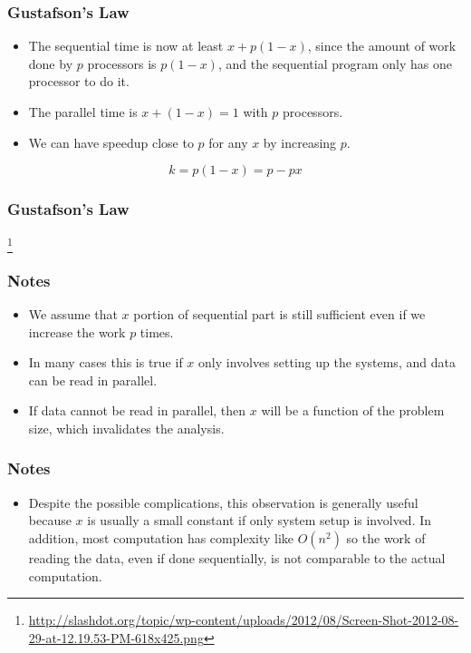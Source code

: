 \documentclass{beamer}
\begin{document}
\begin{CJK}{UTF8}{bsmi}
\begin{frame}
\frametitle{Gustafson's Law} 
\begin{itemize}
\item The sequential time is now at least $x + p (1-x)$, since the
  amount of work done by $p$ processors is $p (1 - x)$, and the
  sequential program only has one processor to do it.
\item The parallel time is $x + (1-x) = 1$ with $p$ processors.
\item We can have speedup close to $p$ for any $x$ by increasing $p$.
\end{itemize}
\begin{equation}
k = p (1 - x) = p - px
\end{equation}
\end{frame}

\begin{frame}
\frametitle{Gustafson's Law} 
\centerline{}
\footnote{\url{http://slashdot.org/topic/wp-content/uploads/2012/08/Screen-Shot-2012-08-29-at-12.19.53-PM-618x425.png}}
\end{frame}

\begin{frame}
\frametitle{Notes}
\begin{itemize}
\item We assume that $x$ portion of sequential part is still
  sufficient even if we increase the work $p$ times.
\item In many cases this is true if $x$ only involves setting up the
  systems, and data can be read in parallel.
\item If data cannot be read in parallel, then $x$ will be a function
  of the problem size, which invalidates the analysis.
\end{itemize}
\end{frame}

\begin{frame}
\frametitle{Notes}
\begin{itemize}
\item Despite the possible complications, this observation is generally
  useful because $x$ is usually a small constant if only system setup
  is involved.  In addition, most computation has complexity like
  $O(n^2)$ so the work of reading the data, even if done sequentially,
  is not comparable to the actual computation.
\end{itemize}
\end{frame}


\end{CJK}
\end{document}
